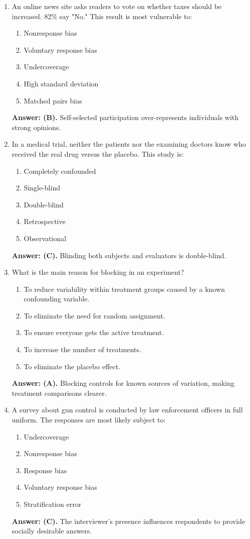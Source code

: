 \begin{enumerate}[leftmargin=1.5em]
  \item An online news site asks readers to vote on whether taxes should be increased. 82\% say "No." This result is most vulnerable to:
  \begin{enumerate}[label=(\Alph*)]
    \item Nonresponse bias \item Voluntary response bias \item Undercoverage \item High standard deviation \item Matched pairs bias
  \end{enumerate}
  \textbf{Answer: (B).} Self-selected participation over-represents individuals with strong opinions.

  \item In a medical trial, neither the patients nor the examining doctors know who received the real drug versus the placebo. This study is:
  \begin{enumerate}[label=(\Alph*)]
    \item Completely confounded \item Single-blind \item Double-blind \item Retrospective \item Observational
  \end{enumerate}
  \textbf{Answer: (C).} Blinding both subjects and evaluators is double-blind.

  \item What is the main reason for blocking in an experiment?
  \begin{enumerate}[label=(\Alph*)]
    \item To reduce variability within treatment groups caused by a known confounding variable.
    \item To eliminate the need for random assignment.
    \item To ensure everyone gets the active treatment.
    \item To increase the number of treatments.
    \item To eliminate the placebo effect.
  \end{enumerate}
  \textbf{Answer: (A).} Blocking controls for known sources of variation, making treatment comparisons clearer.

  \item A survey about gun control is conducted by law enforcement officers in full uniform. The responses are most likely subject to:
  \begin{enumerate}[label=(\Alph*)]
    \item Undercoverage \item Nonresponse bias \item Response bias \item Voluntary response bias \item Stratification error
  \end{enumerate}
  \textbf{Answer: (C).} The interviewer's presence influences respondents to provide socially desirable answers.


\end{enumerate}
